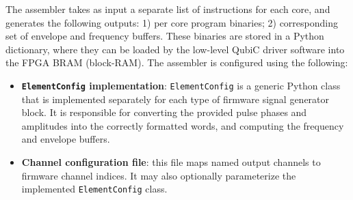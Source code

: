 \documentclass[journal]{IEEEtran}
\begin{document}
The assembler takes as input a separate list of instructions for each core, and generates the following outputs: 1) per core program binaries; 2) corresponding set of envelope and frequency buffers. These binaries are stored in a Python dictionary, where they can be loaded by the low-level QubiC driver software into the FPGA BRAM (block-RAM). The assembler is configured using the following:
\begin{itemize}
    \item \textbf{\texttt{ElementConfig} implementation}: \texttt{ElementConfig} is a generic Python class that is implemented separately for each type of firmware signal generator block. It is responsible for converting the provided pulse phases and amplitudes into the correctly formatted words, and computing the frequency and envelope buffers.
    \item \textbf{Channel configuration file}: this file maps named output channels to firmware channel indices. It may also optionally parameterize the implemented \texttt{ElementConfig} class.
\end{itemize}
\end{document}
